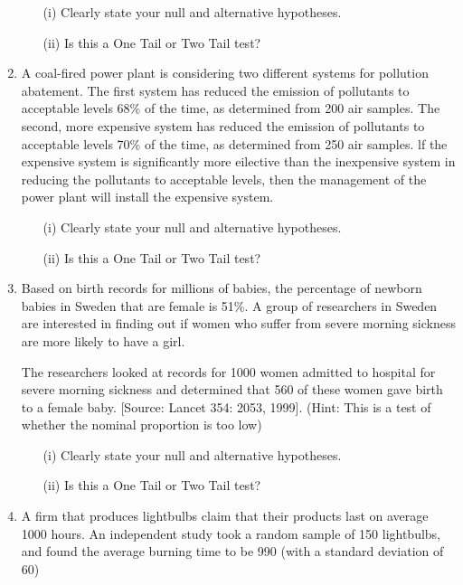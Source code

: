 \begin{enumerate}
	\begin{itemize}
	\item[(i)] Clearly state your null and alternative hypotheses.
	\item[(ii)] Is this a One Tail or Two Tail test?
\end{itemize}

\item 
A coal-fired power plant is considering two different systems for pollution abatement. The first system has reduced the emission of pollutants to acceptable levels 68\% of the time, as determined from 200 air samples. The second, more expensive system has reduced the emission of
pollutants to acceptable levels 70\% of the time, as determined from 250 air samples. lf the expensive system is significantly more eilective than the inexpensive system in reducing the pollutants to acceptable levels, then the management of the power plant will install the expensive system.
	\begin{itemize}
	\item[(i)] Clearly state your null and alternative hypotheses.
	\item[(ii)] Is this a One Tail or Two Tail test?
\end{itemize}
\item
Based on birth records for millions of babies, the percentage of newborn babies in Sweden that are female is 51\%. A group of researchers in Sweden are interested in finding out if women who suffer from severe morning
sickness are more likely to have a girl.

The researchers looked at records for 1000 women admitted to hospital for
severe morning sickness and determined that 560 of these women gave birth
to a female baby.  [Source: Lancet 354: 2053, 1999].
(Hint: This is a test of whether the nominal proportion is too low)
\begin{itemize}
	\item[(i)] Clearly state your null and alternative hypotheses.
	\item[(ii)] Is this a One Tail or Two Tail test?
\end{itemize}

\item 
	A firm that produces lightbulbs claim that their products last on average 1000 hours. An independent study took a random sample of 150 lightbulbs, and found the average burning time to be 990 (with a standard deviation of 60)
	

\end{enumerate}
